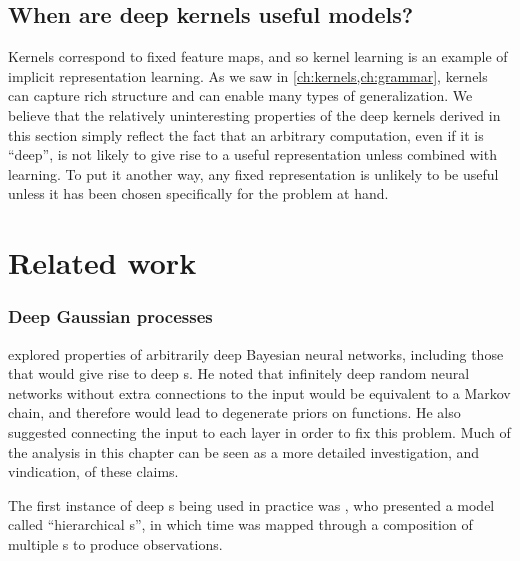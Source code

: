 \subsection{When are deep kernels useful models?}

Kernels correspond to fixed feature maps, and so kernel learning is an example of implicit representation learning. %
As we saw in \cref{ch:kernels,ch:grammar}, kernels can capture rich structure and can enable many types of generalization.
We believe that the relatively uninteresting properties of the deep kernels derived in this section simply reflect the fact that an arbitrary computation, even if it is ``deep'', is not likely to give rise to a useful representation unless combined with learning.
To put it another way, any fixed representation is unlikely to be useful unless it has been chosen specifically for the problem at hand.






\section{Related work}

\subsubsection{Deep Gaussian processes}
\citet[chapter 2]{neal1995bayesian} explored properties of arbitrarily deep Bayesian neural networks, including those that would give rise to deep \gp{}s.
He noted that infinitely deep random neural networks without extra connections to the input would be equivalent to a Markov chain, and therefore would lead to degenerate priors on functions.
He also suggested connecting the input to each layer in order to fix this problem.
Much of the analysis in this chapter can be seen as a more detailed investigation, and vindication, of these claims.

The first instance of deep \gp{}s being used in practice was \citet{lawrence2007hierarchical}, who presented a model called ``hierarchical \gplvm{}s'', in which time was mapped through a composition of multiple \gp{}s to produce observations.

